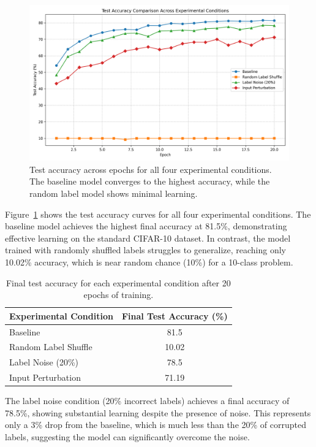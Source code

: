 \documentclass[10pt,twocolumn,letterpaper]{article}
\begin{document}
\begin{figure}[t]
  \centering
  \includegraphics[width=0.9\linewidth]{results/comparison_test_acc.png}
  \caption{Test accuracy across epochs for all four experimental conditions. The baseline model converges to the highest accuracy, while the random label model shows minimal learning.}
  \label{fig:acc_comparison}
\end{figure}

Figure~\ref{fig:acc_comparison} shows the test accuracy curves for all four experimental conditions.
The baseline model achieves the highest final accuracy at 81.5\%, demonstrating effective learning on the standard CIFAR-10 dataset.
In contrast, the model trained with randomly shuffled labels struggles to generalize, reaching only 10.02\% accuracy, which is near random chance (10\%) for a 10-class problem.

\begin{table}
  \centering
  \begin{tabular}{@{}lc@{}}
    \toprule
    Experimental Condition & Final Test Accuracy (\%) \\
    \midrule
    Baseline & 81.5 \\
    Random Label Shuffle & 10.02 \\
    Label Noise (20\%) & 78.5 \\
    Input Perturbation & 71.19 \\
    \bottomrule
  \end{tabular}
  \caption{Final test accuracy for each experimental condition after 20 epochs of training.}
  \label{tab:final_acc}
\end{table}

The label noise condition (20\% incorrect labels) achieves a final accuracy of 78.5\%, showing substantial learning despite the presence of noise.
This represents only a 3\% drop from the baseline, which is much less than the 20\% of corrupted labels, suggesting the model can significantly overcome the noise.
\end{document}
